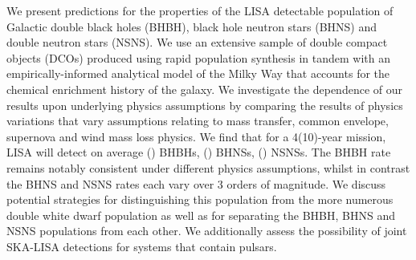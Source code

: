 We present predictions for the properties of the LISA detectable population of Galactic double black holes (BHBH), black hole neutron stars (BHNS) and double neutron stars (NSNS). We use an extensive sample of double compact objects (DCOs) produced using rapid population synthesis in tandem with an empirically-informed analytical model of the Milky Way that accounts for the chemical enrichment history of the galaxy. We investigate the dependence of our results upon underlying physics assumptions by comparing the results of \nModels{} physics variations that vary assumptions relating to mass transfer, common envelope, supernova and wind mass loss physics. We find that for a 4(10)-year mission, LISA will detect on average \BHBHFourYear{}(\BHBHTenYear{}) BHBHs, \BHNSFourYear{}(\BHNSTenYear{}) BHNSs, \NSNSFourYear{}(\NSNSTenYear{}) NSNSs. The BHBH rate remains notably consistent under different physics assumptions, whilst in contrast the BHNS and NSNS rates each vary over 3 orders of magnitude. We discuss potential strategies for distinguishing this population from the more numerous double white dwarf population as well as for separating the BHBH, BHNS and NSNS populations from each other. We additionally assess the possibility of joint SKA-LISA detections for systems that contain pulsars.
